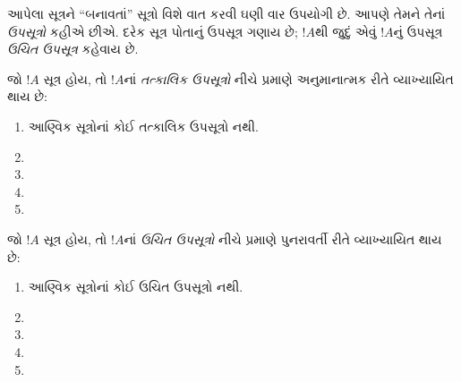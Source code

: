 \begingroup
\makeatletter{}\makeatother


\label{guunit:OLP-0155}


\begin{explain}
આપેલા સૂત્રને ``બનાવતાં'' સૂત્રો વિશે વાત કરવી ઘણી વાર
ઉપયોગી છે. આપણે તેમને તેનાં \emph{ઉપસૂત્રો} કહીએ છીએ. દરેક
સૂત્ર પોતાનું ઉપસૂત્ર ગણાય છે; $!A$થી જુદું એવું $!A$નું
ઉપસૂત્ર \emph{ઉચિત ઉપસૂત્ર} કહેવાય છે.
\end{explain}

\begin{defn}[તત્કાલિક ઉપસૂત્ર]
જો $!A$ સૂત્ર હોય, તો $!A$નાં \emph{તત્કાલિક
ઉપસૂત્રો} નીચે પ્રમાણે અનુમાનાત્મક રીતે વ્યાખ્યાયિત થાય છે:
\begin{enumerate}
\item આણ્વિક સૂત્રોનાં કોઈ તત્કાલિક ઉપસૂત્રો નથી.

\item {}

\item {}

\item {}

\item {}
\end{enumerate}
\end{defn}

\begin{defn}[ઉચિત ઉપસૂત્ર]
જો $!A$ સૂત્ર હોય, તો $!A$નાં \emph{ઉચિત ઉપસૂત્રો}
નીચે પ્રમાણે પુનરાવર્તી રીતે વ્યાખ્યાયિત થાય છે:
\begin{enumerate}
\item આણ્વિક સૂત્રોનાં કોઈ ઉચિત ઉપસૂત્રો નથી.

\item {}

\item {}

\item {}

\item {}
\end{enumerate}
\end{defn}

